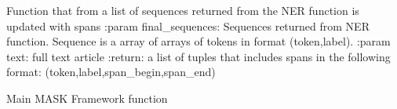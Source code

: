 \documentclass[letterpaper,10pt,english]{sphinxmanual}
\begin{document}

\begin{fulllineitems}
\label{\detokenize{index:mask_framework.consolidate_NER_results}}
Function that from a list of sequences returned from the NER function is updated with spans
:param final\_sequences: Sequences returned from NER function. Sequence is a array of arrays of tokens in format (token,label).
:param text: full text article
:return: a list of tuples that includes spans in the following format: (token,label,span\_begin,span\_end)

\end{fulllineitems}


\begin{fulllineitems}
\label{\detokenize{index:mask_framework.main}}
Main MASK Framework function

\end{fulllineitems}

\end{document}

